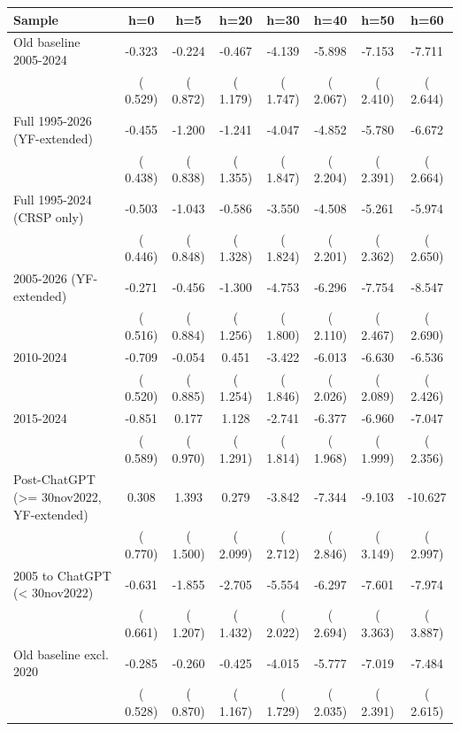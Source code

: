 \begin{tabular}{lccccccc}\hline\hline
Sample & h=0 & h=5 & h=20 & h=30 & h=40 & h=50 & h=60 \\\hline
Old baseline 2005-2024 & -0.323 & -0.224 & -0.467 & -4.139 & -5.898 & -7.153 & -7.711 \\
 & ( 0.529) & ( 0.872) & ( 1.179) & ( 1.747) & ( 2.067) & ( 2.410) & ( 2.644) \\
Full 1995-2026 (YF-extended) & -0.455 & -1.200 & -1.241 & -4.047 & -4.852 & -5.780 & -6.672 \\
 & ( 0.438) & ( 0.838) & ( 1.355) & ( 1.847) & ( 2.204) & ( 2.391) & ( 2.664) \\
Full 1995-2024 (CRSP only) & -0.503 & -1.043 & -0.586 & -3.550 & -4.508 & -5.261 & -5.974 \\
 & ( 0.446) & ( 0.848) & ( 1.328) & ( 1.824) & ( 2.201) & ( 2.362) & ( 2.650) \\
2005-2026 (YF-extended) & -0.271 & -0.456 & -1.300 & -4.753 & -6.296 & -7.754 & -8.547 \\
 & ( 0.516) & ( 0.884) & ( 1.256) & ( 1.800) & ( 2.110) & ( 2.467) & ( 2.690) \\
2010-2024 & -0.709 & -0.054 &  0.451 & -3.422 & -6.013 & -6.630 & -6.536 \\
 & ( 0.520) & ( 0.885) & ( 1.254) & ( 1.846) & ( 2.026) & ( 2.089) & ( 2.426) \\
2015-2024 & -0.851 &  0.177 &  1.128 & -2.741 & -6.377 & -6.960 & -7.047 \\
 & ( 0.589) & ( 0.970) & ( 1.291) & ( 1.814) & ( 1.968) & ( 1.999) & ( 2.356) \\
Post-ChatGPT (>= 30nov2022, YF-extended) &  0.308 &  1.393 &  0.279 & -3.842 & -7.344 & -9.103 & -10.627 \\
 & ( 0.770) & ( 1.500) & ( 2.099) & ( 2.712) & ( 2.846) & ( 3.149) & ( 2.997) \\
2005 to ChatGPT (< 30nov2022) & -0.631 & -1.855 & -2.705 & -5.554 & -6.297 & -7.601 & -7.974 \\
 & ( 0.661) & ( 1.207) & ( 1.432) & ( 2.022) & ( 2.694) & ( 3.363) & ( 3.887) \\
Old baseline excl. 2020 & -0.285 & -0.260 & -0.425 & -4.015 & -5.777 & -7.019 & -7.484 \\
 & ( 0.528) & ( 0.870) & ( 1.167) & ( 1.729) & ( 2.035) & ( 2.391) & ( 2.615) \\

\end{tabular}
